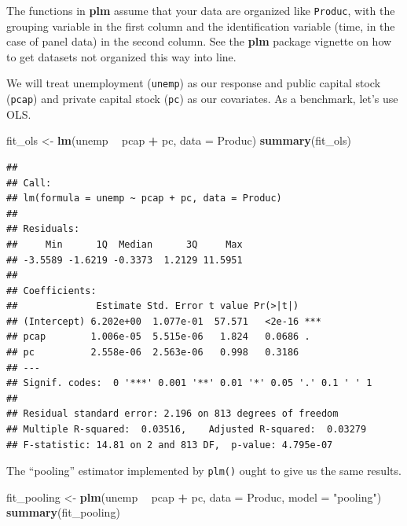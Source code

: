 \documentclass[12pt,oneside,openany]{book}
\newenvironment{Shaded}{\begin{snugshade}}{\end{snugshade}}
\newcommand{\KeywordTok}[1]{\textcolor[rgb]{0.13,0.29,0.53}{\textbf{#1}}}
\newcommand{\DataTypeTok}[1]{\textcolor[rgb]{0.13,0.29,0.53}{#1}}
\newcommand{\StringTok}[1]{\textcolor[rgb]{0.31,0.60,0.02}{#1}}
\newcommand{\OperatorTok}[1]{\textcolor[rgb]{0.81,0.36,0.00}{\textbf{#1}}}
\newcommand{\NormalTok}[1]{#1}
\begin{document}
The functions in \textbf{plm} assume that your data are organized like
\texttt{Produc}, with the grouping variable in the first column and the
identification variable (time, in the case of panel data) in the second
column. See the \textbf{plm} package vignette on how to get datasets not
organized this way into line.

We will treat unemployment (\texttt{unemp}) as our response and public
capital stock (\texttt{pcap}) and private capital stock (\texttt{pc}) as
our covariates. As a benchmark, let's use OLS.

\begin{Shaded}
\begin{Highlighting}[]
\NormalTok{fit_ols <-}\StringTok{ }\KeywordTok{lm}\NormalTok{(unemp }\OperatorTok{~}\StringTok{ }\NormalTok{pcap }\OperatorTok{+}\StringTok{ }\NormalTok{pc,}
              \DataTypeTok{data =}\NormalTok{ Produc)}
\KeywordTok{summary}\NormalTok{(fit_ols)}
\end{Highlighting}
\end{Shaded}

\begin{verbatim}
## 
## Call:
## lm(formula = unemp ~ pcap + pc, data = Produc)
## 
## Residuals:
##     Min      1Q  Median      3Q     Max 
## -3.5589 -1.6219 -0.3373  1.2129 11.5951 
## 
## Coefficients:
##              Estimate Std. Error t value Pr(>|t|)    
## (Intercept) 6.202e+00  1.077e-01  57.571   <2e-16 ***
## pcap        1.006e-05  5.515e-06   1.824   0.0686 .  
## pc          2.558e-06  2.563e-06   0.998   0.3186    
## ---
## Signif. codes:  0 '***' 0.001 '**' 0.01 '*' 0.05 '.' 0.1 ' ' 1
## 
## Residual standard error: 2.196 on 813 degrees of freedom
## Multiple R-squared:  0.03516,    Adjusted R-squared:  0.03279 
## F-statistic: 14.81 on 2 and 813 DF,  p-value: 4.795e-07
\end{verbatim}

The ``pooling'' estimator implemented by \texttt{plm()} ought to give us
the same results.

\begin{Shaded}
\begin{Highlighting}[]
\NormalTok{fit_pooling <-}\StringTok{ }\KeywordTok{plm}\NormalTok{(unemp }\OperatorTok{~}\StringTok{ }\NormalTok{pcap }\OperatorTok{+}\StringTok{ }\NormalTok{pc,}
                   \DataTypeTok{data =}\NormalTok{ Produc,}
                   \DataTypeTok{model =} \StringTok{"pooling"}\NormalTok{)}
\KeywordTok{summary}\NormalTok{(fit_pooling)}
\end{Highlighting}
\end{Shaded}
\end{document}
